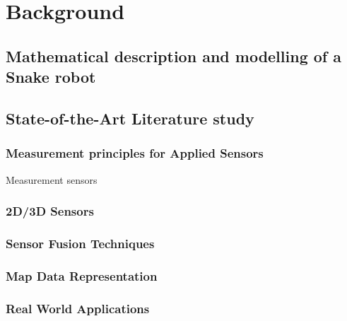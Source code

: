 

\chapter{Background}


\section{Mathematical description and modelling of a Snake robot}


\section{State-of-the-Art Literature study}


\subsection{Measurement principles for Applied Sensors}
Measurement sensors



\subsection{2D/3D Sensors}


\subsection{Sensor Fusion Techniques}


\subsection{Map Data Representation}


\subsection{Real World Applications}



